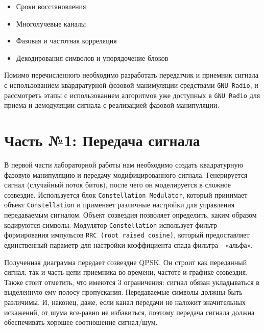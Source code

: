 \documentclass[a4paper]{article}
\begin{document}
            \begin{itemize}
                \item Сроки восстановления
                \item Многолучевые каналы
                \item Фазовая и частотная корреляция
                \item Декодирования символов и упорядочение блоков
            \end{itemize}
            
            Помимо перечисленного необходимо разработать передатчик и приемник сигнала с  использованием квардратурной фозовой манимуляции средствами \texttt{GNU Radio}, и рассмотреть этапы с использованием алгоритмов уже доступных в \texttt{GNU Radio} для приема и демодуляции сигнала с реализацией фазовой манипуляции.
            
    \newpage
        \section{Часть №1: Передача сигнала}
           В первой части лабораторной работы нам необходимо создать квадратурную фазовую манипуляцию и передачу модифицированного сигнала. Генерируется сигнал (случайный поток битов), после чего он моделируется в сложное созвездие. Используется блок \texttt{Constellation Modulator}, который принимает объект \texttt{Constellation} и применяет различные настройки для управления передаваемым сигналом. Объект созвездия позволяет определить, каким образом кодируются символы. Модулятор \texttt{Constellation} использует фильтр формирования импульсов \texttt{RRC (root raised cosine)}, который предоставляет единственный параметр для настройки коэффициента спада фильтра - «альфа».
           
           Полученная диаграмма передает созвездие QPSK. Он строит как переданный сигнал, так и часть цепи приемника во времени, частоте и графике созвездия. Также стоит отметить, что имеются 3 ограничения: сигнал обязан укладываться в выделенную ему полосу пропускания. Передаваемые символы должны быть различимы. И, наконец, даже, если канал передачи не наложит значительных искажений, от шума все-равно не избавиться, поэтому передача сигнала должна обеспечивать хорошее соотношение сигнал/шум.
           
\end{document}
